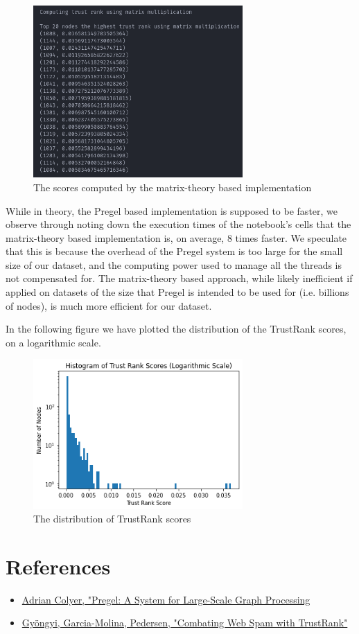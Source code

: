\documentclass[conference]{IEEEtran}
\begin{document}
\begin{figure}[H]
    \centering
    \includegraphics[width=8cm]{images/matrixscores.png}
    \caption{The scores computed by the matrix-theory based implementation}
    \label{fig:my_label}
\end{figure}
While in theory, the Pregel based implementation is supposed to be faster, we observe through noting down the execution times of the notebook's cells that the matrix-theory based implementation is, on average, 8 times faster. We speculate that this is because the overhead of the Pregel system is too large for the small size of our dataset, and the computing power used to manage all the threads is not compensated for. The matrix-theory based approach, while likely inefficient if applied on datasets of the size that Pregel is intended to be used for (i.e. billions of nodes), is much more efficient for our dataset.

In the following figure we have plotted the distribution of the TrustRank scores, on a logarithmic scale.
\begin{figure}[H]
    \centering
    \includegraphics[width=8cm]{images/histogram.png}
    \caption{The distribution of TrustRank scores}
    \label{fig:my_label}
\end{figure}
\vspace{12pt}

\section{References}
\begin{itemize}
    \item \href{https://blog.acolyer.org/2015/05/26/pregel-a-system-for-large-scale-graph-processing/}{Adrian Colyer, "Pregel: A System for Large-Scale Graph Processing}
    \item \href{https://www.vldb.org/conf/2004/RS15P3.PDF}{Gy\"ongyi, Garcia-Molina, Pedersen, "Combating Web Spam with TrustRank"}
\end{itemize}
\end{document}
